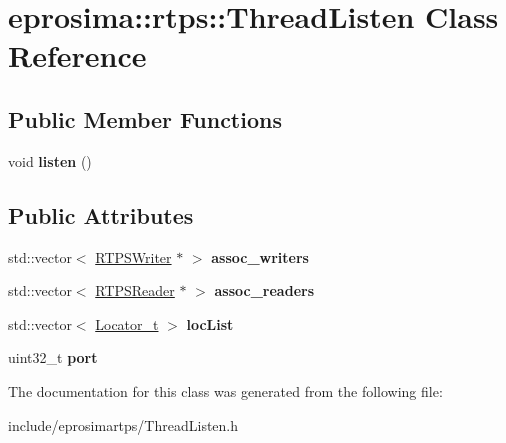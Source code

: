 \hypertarget{classeprosima_1_1rtps_1_1_thread_listen}{\section{eprosima\-:\-:rtps\-:\-:\-Thread\-Listen \-Class \-Reference}
\label{classeprosima_1_1rtps_1_1_thread_listen}
}
\subsection*{\-Public \-Member \-Functions}
\begin{DoxyCompactItemize}
\item 
\hypertarget{classeprosima_1_1rtps_1_1_thread_listen_a53b6084d858b68296e88f026d1dd6458}{void {\bfseries listen} ()}\label{classeprosima_1_1rtps_1_1_thread_listen_a53b6084d858b68296e88f026d1dd6458}

\end{DoxyCompactItemize}
\subsection*{\-Public \-Attributes}
\begin{DoxyCompactItemize}
\item 
\hypertarget{classeprosima_1_1rtps_1_1_thread_listen_adc32e9009d9f74359919a0b405a5914d}{std\-::vector$<$ \hyperlink{classeprosima_1_1rtps_1_1_r_t_p_s_writer}{\-R\-T\-P\-S\-Writer} $\ast$ $>$ {\bfseries assoc\-\_\-writers}}\label{classeprosima_1_1rtps_1_1_thread_listen_adc32e9009d9f74359919a0b405a5914d}

\item 
\hypertarget{classeprosima_1_1rtps_1_1_thread_listen_ae52f56ff894629fbdf2a05c80a2d744e}{std\-::vector$<$ \hyperlink{classeprosima_1_1rtps_1_1_r_t_p_s_reader}{\-R\-T\-P\-S\-Reader} $\ast$ $>$ {\bfseries assoc\-\_\-readers}}\label{classeprosima_1_1rtps_1_1_thread_listen_ae52f56ff894629fbdf2a05c80a2d744e}

\item 
\hypertarget{classeprosima_1_1rtps_1_1_thread_listen_a5973973b73d35087748820fbc28b2ebd}{std\-::vector$<$ \hyperlink{structeprosima_1_1rtps_1_1_locator__t}{\-Locator\-\_\-t} $>$ {\bfseries loc\-List}}\label{classeprosima_1_1rtps_1_1_thread_listen_a5973973b73d35087748820fbc28b2ebd}

\item 
\hypertarget{classeprosima_1_1rtps_1_1_thread_listen_a2a0ffdffec752cf83316857ec7612247}{uint32\-\_\-t {\bfseries port}}\label{classeprosima_1_1rtps_1_1_thread_listen_a2a0ffdffec752cf83316857ec7612247}

\end{DoxyCompactItemize}


\-The documentation for this class was generated from the following file\-:\begin{DoxyCompactItemize}
\item 
include/eprosimartps/\-Thread\-Listen.\-h\end{DoxyCompactItemize}
